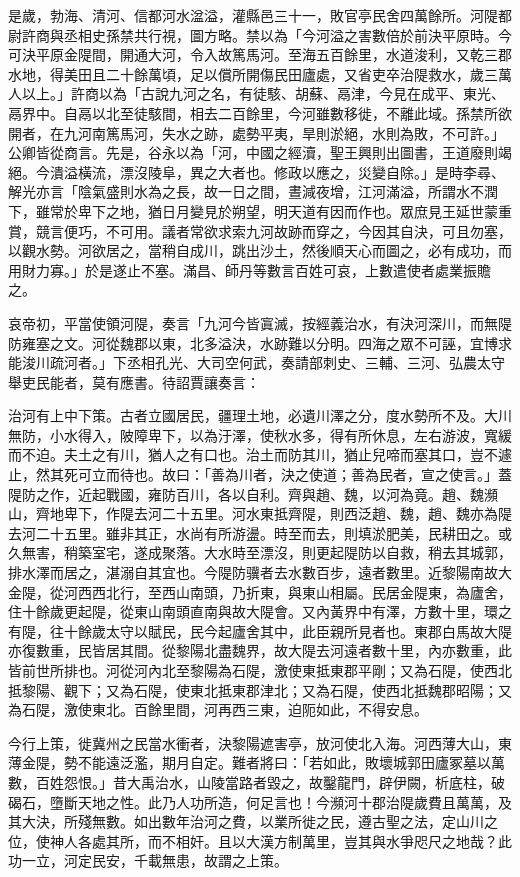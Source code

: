 \begin{pinyinscope}
是歲，勃海、清河、信都河水湓溢，灌縣邑三十一，敗官亭民舍四萬餘所。河隄都尉許商與丞相史孫禁共行視，圖方略。禁以為「今河溢之害數倍於前決平原時。今可決平原金隄間，開通大河，令入故篤馬河。至海五百餘里，水道浚利，又乾三郡水地，得美田且二十餘萬頃，足以償所開傷民田廬處，又省吏卒治隄救水，歲三萬人以上。」許商以為「古說九河之名，有徒駭、胡蘇、鬲津，今見在成平、東光、鬲界中。自鬲以北至徒駭間，相去二百餘里，今河雖數移徙，不離此域。孫禁所欲開者，在九河南篤馬河，失水之跡，處勢平夷，旱則淤絕，水則為敗，不可許。」公卿皆從商言。先是，谷永以為「河，中國之經瀆，聖王興則出圖書，王道廢則竭絕。今潰溢橫流，漂沒陵阜，異之大者也。修政以應之，災變自除。」是時李尋、解光亦言「陰氣盛則水為之長，故一日之間，晝減夜增，江河滿溢，所謂水不潤下，雖常於卑下之地，猶日月變見於朔望，明天道有因而作也。眾庶見王延世蒙重賞，競言便巧，不可用。議者常欲求索九河故跡而穿之，今因其自決，可且勿塞，以觀水勢。河欲居之，當稍自成川，跳出沙土，然後順天心而圖之，必有成功，而用財力寡。」於是遂止不塞。滿昌、師丹等數言百姓可哀，上數遣使者處業振贍之。

哀帝初，平當使領河隄，奏言「九河今皆寘滅，按經義治水，有決河深川，而無隄防雍塞之文。河從魏郡以東，北多溢決，水跡難以分明。四海之眾不可誣，宜博求能浚川疏河者。」下丞相孔光、大司空何武，奏請部刺史、三輔、三河、弘農太守舉吏民能者，莫有應書。待詔賈讓奏言：

治河有上中下策。古者立國居民，疆理土地，必遺川澤之分，度水勢所不及。大川無防，小水得入，陂障卑下，以為汙澤，使秋水多，得有所休息，左右游波，寬緩而不迫。夫土之有川，猶人之有口也。治土而防其川，猶止兒啼而塞其口，豈不遽止，然其死可立而待也。故曰：「善為川者，決之使道；善為民者，宣之使言。」蓋隄防之作，近起戰國，雍防百川，各以自利。齊與趙、魏，以河為竟。趙、魏瀕山，齊地卑下，作隄去河二十五里。河水東抵齊隄，則西泛趙、魏，趙、魏亦為隄去河二十五里。雖非其正，水尚有所游盪。時至而去，則填淤肥美，民耕田之。或久無害，稍築室宅，遂成聚落。大水時至漂沒，則更起隄防以自救，稍去其城郭，排水澤而居之，湛溺自其宜也。今隄防骥者去水數百步，遠者數里。近黎陽南故大金隄，從河西西北行，至西山南頭，乃折東，與東山相屬。民居金隄東，為廬舍，住十餘歲更起隄，從東山南頭直南與故大隄會。又內黃界中有澤，方數十里，環之有隄，往十餘歲太守以賦民，民今起廬舍其中，此臣親所見者也。東郡白馬故大隄亦復數重，民皆居其間。從黎陽北盡魏界，故大隄去河遠者數十里，內亦數重，此皆前世所排也。河從河內北至黎陽為石隄，激使東抵東郡平剛；又為石隄，使西北抵黎陽、觀下；又為石隄，使東北抵東郡津北；又為石隄，使西北抵魏郡昭陽；又為石隄，激使東北。百餘里間，河再西三東，迫阨如此，不得安息。

今行上策，徙冀州之民當水衝者，決黎陽遮害亭，放河使北入海。河西薄大山，東薄金隄，勢不能遠泛濫，期月自定。難者將曰：「若如此，敗壞城郭田廬冢墓以萬數，百姓怨恨。」昔大禹治水，山陵當路者毀之，故鑿龍門，辟伊闕，析底柱，破碣石，墮斷天地之性。此乃人功所造，何足言也！今瀕河十郡治隄歲費且萬萬，及其大決，所殘無數。如出數年治河之費，以業所徙之民，遵古聖之法，定山川之位，使神人各處其所，而不相奸。且以大漢方制萬里，豈其與水爭咫尺之地哉？此功一立，河定民安，千載無患，故謂之上策。


\end{pinyinscope}
